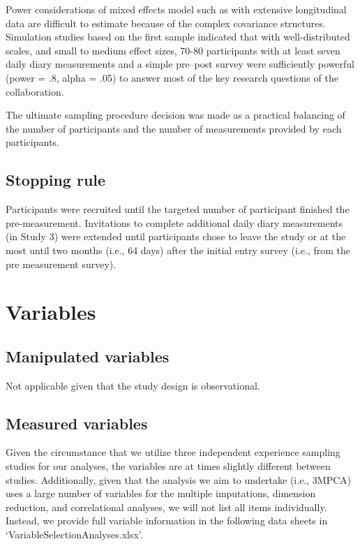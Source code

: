 \documentclass[]{article}
\newcounter{question}
\begin{document}
Power considerations of mixed effects model such as with extensive
longitudinal data are difficult to estimate because of the complex
covariance structures. Simulation studies based on the first sample
indicated that with well-distributed scales, and small to medium effect
sizes, 70-80 participants with at least seven daily diary measurements
and a simple pre--post survey were sufficiently powerful (power = .8,
alpha = .05) to answer most of the key research questions of the
collaboration.

The ultimate sampling procedure decision was made as a practical
balancing of the number of participants and the number of measurements
provided by each participants.

\hypertarget{stopping-rule}{%
\subsection{Stopping rule}\label{stopping-rule}}

Participants were recruited until the targeted number of participant
finished the pre-measurement. Invitations to complete additional daily
diary measurements (in Study 3) were extended until participants chose
to leave the study or at the most until two months (i.e., 64 days) after
the initial entry survey (i.e., from the pre measurement survey).

\hypertarget{variables}{%
\section{Variables}\label{variables}}

\hypertarget{manipulated-variables}{%
\subsection{Manipulated variables}\label{manipulated-variables}}

Not applicable given that the study design is observational.

\hypertarget{measured-variables}{%
\subsection{Measured variables}\label{measured-variables}}

Given the circumstance that we utilize three independent experience
sampling studies for our analyses, the variables are at times slightly
different between studies. Additionally, given that the analysis we aim
to undertake (i.e., 3MPCA) uses a large number of variables for the
multiple imputations, dimension reduction, and correlational analyses,
we will not list all items individually. Instead, we provide full
variable information in the following data sheets in
`VariableSelectionAnalyses.xlsx'.
\end{document}
